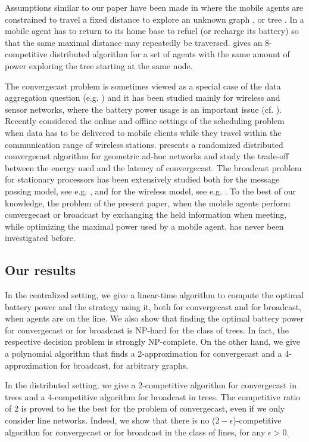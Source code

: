 \documentclass{article}
\newcommand\convergecast{convergecast\xspace}
\newcommand\broadcast{broadcast\xspace}
\begin{document}
Assumptions similar to our paper have been made in \cite{ABRS,BlRS,DKS} where the mobile agents are constrained to travel a fixed distance to explore an unknown graph \cite{ABRS,BlRS}, or tree \cite{DKS}. In \cite{ABRS,BlRS} a mobile agent has to return to its home base to refuel (or recharge its battery) so that the same maximal distance may repeatedly be traversed. \cite{DKS} gives an 8-competitive distributed algorithm for a set of agents  with the same amount of power exploring the tree starting at the same node.

The {\convergecast} problem is sometimes viewed as a special case of the data aggregation question (e.g. \cite{KEW,RV}) and it has been studied mainly for wireless and sensor networks, where the battery power usage is an important issue (cf. \cite{KK,AGS}). Recently \cite{CJABL} considered the online and offline settings of the scheduling problem when data has to be delivered to mobile clients while they travel within the communication range of wireless stations. \cite{KK} presents a randomized distributed {\convergecast} algorithm for geometric ad-hoc networks and study the trade-off between the energy used and the latency of {\convergecast}. The \broadcast problem for stationary processors has been extensively studied both for the message passing model, see e.g. \cite{AGP}, and for the wireless model, see e.g. \cite{BGI}. To the best of our knowledge, the problem of the present paper, when the mobile agents perform {\convergecast} or broadcast by exchanging the held information when meeting, while optimizing the maximal power used by a mobile agent, has never been investigated before. 


\subsection{Our results}\label{s:results}


In the centralized setting, we give a linear-time algorithm to compute the optimal battery power and the strategy using it, both for \convergecast and for \broadcast, when agents are on the line. We also show that finding the optimal battery power for \convergecast or for \broadcast is NP-hard for the class of trees. In fact, the respective decision problem is strongly NP-complete. On the other hand, we give a polynomial algorithm that finds a 2-approximation for \convergecast and a 4-approximation for \broadcast, for arbitrary graphs.

In the distributed setting, we give a 2-competitive 
algorithm for {\convergecast} in trees and a 4-competitive algorithm for \broadcast in trees. The competitive ratio of 2 is proved to be the best for the problem of \convergecast, even if we only consider line networks. Indeed, we show that there is no ($2-\epsilon$)-competitive algorithm for \convergecast or for \broadcast in the class of lines, for any $\epsilon>0$.
\end{document}
